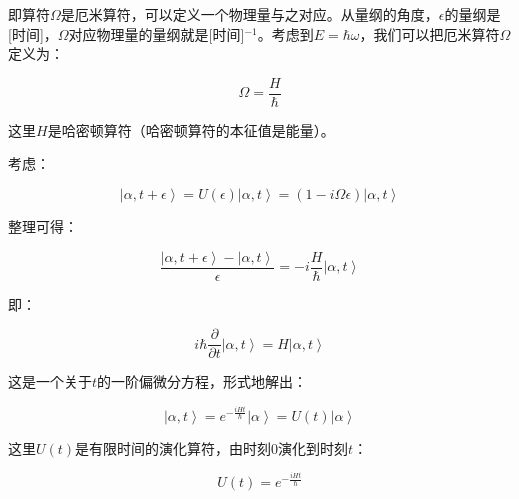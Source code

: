 即算符$\Omega$是厄米算符，可以定义一个物理量与之对应。从量纲的角度，$\epsilon$的量纲是[时间]，$\Omega$对应物理量的量纲就是[时间]$^{-1}$。考虑到$E = \hbar \omega$，我们可以把厄米算符$\Omega$定义为：

\begin{equation}
\Omega = \frac{H}{\hbar}
\end{equation}

这里$H$是哈密顿算符（哈密顿算符的本征值是能量）。

考虑：

\begin{equation*}
\left| \alpha, t + \epsilon \right\rangle = U(\epsilon ) \left| \alpha, t \right\rangle = \left( 1- i \Omega \epsilon \right) \left| \alpha, t \right\rangle
\end{equation*}

整理可得：

\begin{equation*}
\frac{ \left| \alpha, t + \epsilon \right\rangle - \left| \alpha, t \right\rangle }{\epsilon} = - i \frac{H }{\hbar} \left| \alpha, t \right\rangle
\end{equation*}

即：

\begin{equation}
i \hbar \frac{\partial }{\partial t} \left| \alpha, t \right\rangle = H \left| \alpha, t \right\rangle
\end{equation}

这是一个关于$t$的一阶偏微分方程，形式地解出：

\begin{equation}
\left| \alpha , t \right\rangle = e^{- \frac{i H t}{\hbar}} \left| \alpha \right\rangle = U(t ) \left| \alpha \right\rangle
\end{equation}

这里$U(t)$是有限时间的演化算符，由时刻$0$演化到时刻$t$：

\begin{equation}
U (t) = e^{- \frac{i H t}{\hbar}}
\end{equation}

